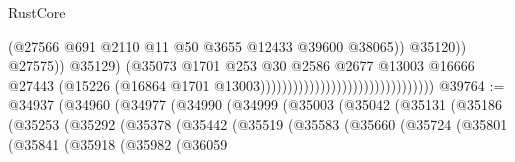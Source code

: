 \begin{lexlean}{RustCore}
\begin{coremodule}
                                                                          (@27566
                                                                            @691
                                                                            @2110
                                                                            @11
                                                                            @50
                                                                            @3655
                                                                            @12433
                                                                            @39600
                                                                            @38065))
                                                                        @35120))
                                                                    @27575))
                                                                @35129)
                                                              (@35073
                                                                @1701
                                                                @253
                                                                @30
                                                                @2586
                                                                @2677
                                                                @13003
                                                                @16666
                                                                @27443
                                                                (@15226
                                                                  (@16864
                                                                    @1701
                                                                    @13003))))))))))))))))))))))))))))))))
@39764 := @34937
    (@34960
      (@34977
        (@34990
          (@34999
            (@35003
              (@35042
                (@35131
                  (@35186
                    (@35253
                      (@35292
                        (@35378
                          (@35442
                            (@35519
                              (@35583
                                (@35660
                                  (@35724
                                    (@35801
                                      (@35841
                                        (@35918
                                          (@35982
                                            (@36059

\end{coremodule}
\end{lexlean}
